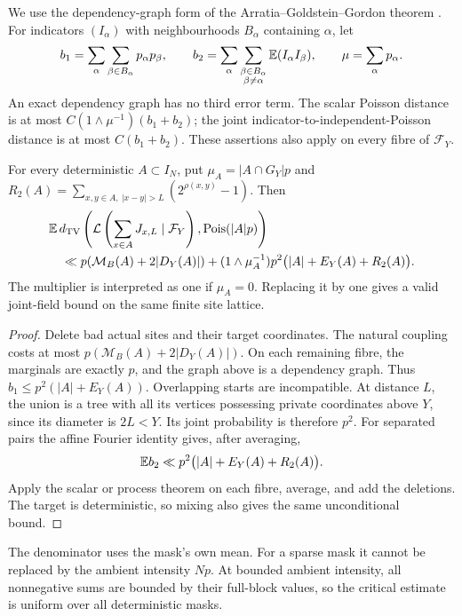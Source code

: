 We use the dependency-graph form of the Arratia--Goldstein--Gordon theorem
\cite{ArratiaGoldsteinGordon1989,ArratiaGoldsteinGordon1990}.
For indicators $(I_\alpha)$ with neighbourhoods $B_\alpha$ containing
$\alpha$, let
\[
 b_1=\sum_\alpha\sum_{\beta\in B_\alpha}p_\alpha p_\beta,
 \qquad
 b_2=\sum_\alpha\sum_{\substack{\beta\in B_\alpha\\\beta\ne\alpha}}
                  \mathbb E(I_\alpha I_\beta),\qquad \mu=\sum_\alpha p_\alpha.
\]
An exact dependency graph has no third error term. The scalar
Poisson distance is at most $C(1\wedge\mu^{-1})(b_1+b_2)$; the joint
indicator-to-independent-Poisson distance is at most $C(b_1+b_2)$.
These assertions also apply on every fibre of $\mathcal F_Y$.

\begin{theorem}\label{thm:transfer}
For every deterministic $A\subset I_N$, put
$\mu_A=|A\cap G_Y|p$ and
$R_2(A)=\sum_{x,y\in A,\ |x-y|>L}(2^{\rho(x,y)}-1)$.
Then
\begin{align}
 &\mathbb E\,d_{\mathrm{TV}}\left(\mathcal L\left(\sum_{x\in A}J_{x,L}\mid\mathcal F_Y\right),
                         \operatorname{Pois}(|A|p)\right)\notag\\
 &\quad\ll p(\mathcal M_B(A)+2|D_Y(A)|)
 +(1\wedge\mu_A^{-1})p^2\bigl(|A|+E_Y(A)+R_2(A)\bigr).
 \label{eq:transfer}
\end{align}
The multiplier is interpreted as one if $\mu_A=0$. Replacing it by one
gives a valid joint-field bound on the same finite site lattice.
\end{theorem}
\begin{proof}
Delete bad actual sites and their target coordinates. The natural coupling
costs at most $p(\mathcal M_B(A)+2|D_Y(A)|)$. On each remaining fibre, the
marginals are exactly $p$, and the graph above is a dependency graph.
Thus $b_1\le p^2(|A|+E_Y(A))$.
Overlapping starts are incompatible. At distance $L$, the union is a tree
with all its vertices possessing private coordinates above $Y$, since its
diameter is $2L<Y$. Its joint probability is therefore $p^2$.
For separated pairs the affine Fourier identity gives, after averaging,
\[
 \mathbb E b_2\ll p^2\bigl(|A|+E_Y(A)+R_2(A)\bigr).
\]
Apply the scalar or process theorem on each fibre, average, and add the
deletions. The target is deterministic, so mixing also gives the same
unconditional bound.
\end{proof}
The denominator uses the mask's own mean. For a sparse mask it cannot be
replaced by the ambient intensity $Np$. At bounded ambient intensity,
all nonnegative sums are bounded by their full-block values, so the critical
estimate is uniform over all deterministic masks.

